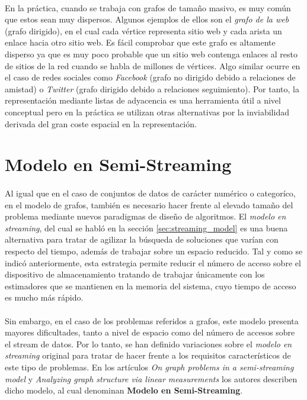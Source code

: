 \documentclass{subfiles}
\begin{document}
        \paragraph{}
        En la práctica, cuando se trabaja con grafos de tamaño masivo, es muy común que estos sean muy dispersos. Algunos ejemplos de ellos son el \emph{grafo de la web} (grafo dirigido), en el cual cada vértice representa sitio web y cada arista un enlace hacia otro sitio web. Es fácil comprobar que este grafo es altamente disperso ya que es muy poco probable que un sitio web contenga enlaces al resto de sitios de la red cuando se habla de millones de vértices. Algo similar ocurre en el caso de redes sociales como \emph{Facebook} (grafo no dirigido debido a relaciones de amistad) o \emph{Twitter} (grafo dirigido debido a relaciones seguimiento). Por tanto, la representación mediante listas de adyacencia es una herramienta útil a nivel conceptual pero en la práctica se utilizan otras alternativas por la inviabilidad derivada del gran coste espacial en la representación.


    \section{Modelo en Semi-Streaming}
    \label{sec:semi_streaming_model}

      \paragraph{}
      Al igual que en el caso de conjuntos de datos de carácter numérico o categoríco, en el modelo de grafos, también es necesario hacer frente al elevado tamaño del problema mediante nuevos paradigmas de diseño de algoritmos. El \emph{modelo en streaming}, del cual se habló en la sección \ref{sec:streaming_model} es una buena alternativa para tratar de agilizar la búsqueda de soluciones que varían con respecto del tiempo, además de trabajar sobre un espacio reducido. Tal y como se indicó anteriormente, esta estrategia permite reducir el número de acceso sobre el dispositivo de almacenamiento tratando de trabajar únicamente con los estimadores que se mantienen en la memoria del sistema, cuyo tiempo de acceso es mucho más rápido.

      \paragraph{}
      Sin embargo, en el caso de los problemas referidos a grafos, este modelo presenta mayores dificultades, tanto a nivel de espacio como del número de accesos sobre el stream de datos. Por lo tanto, se han definido variaciones sobre el \emph{modelo en streaming} original para tratar de hacer frente a los requisitos característicos de este tipo de problemas. En los artículos \emph{On graph problems in a semi-streaming model} \cite{feigenbaum2005graph} y \emph{Analyzing graph structure via linear measurements} \cite{ahn2012analyzing} los autores describen dicho modelo, al cual denominan \textbf{Modelo en Semi-Streaming}.
\end{document}
